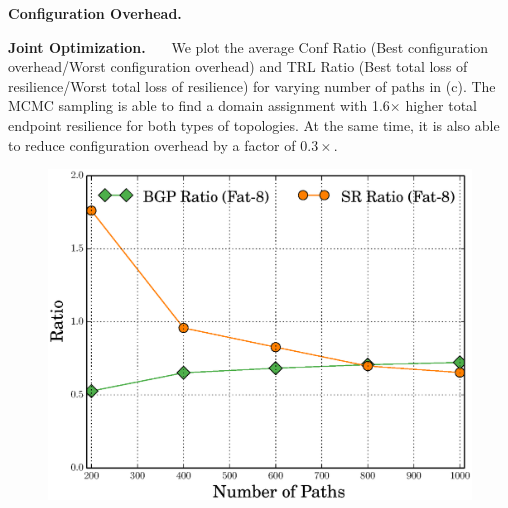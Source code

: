\noindent\textbf{Configuration Overhead.}~~~
%

\noindent\textbf{Joint Optimization.}~~~
We plot the average Conf Ratio 
(Best configuration overhead/Worst configuration overhead) and TRL
Ratio (Best total loss of resilience/Worst total loss of resilience)
for varying number of paths in (c). The MCMC
sampling is able to find a domain assignment
with 1.6$\times$ higher total endpoint resilience for both types
of topologies. At the same time, it is also able to reduce configuration
overhead by a factor of $0.3\times$. 
\begin{figure}[!t]
	\centering
	{\includegraphics[width=0.33\columnwidth]{figures/ratioMCMC.eps}}
\end{figure}

